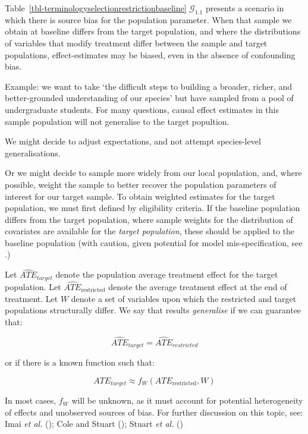 \documentclass[
  single column]{article}
\begin{document}
Table~\ref{tbl-terminologyselectionrestrictionbaseline}
\(\mathcal{G}_{1.1}\) presents a scenario in which there is source bias
for the population parameter. When that sample we obtain at baseline
differs from the target population, and where the distributions of
variables that modify treatment differ between the sample and target
populations, effect-estimates may be biased, even in the absence of
confounding bias.

Example: we want to take `the difficult steps to building a broader,
richer, and better-grounded understanding of our species' but have
sampled from a pool of undergraduate students. For many questions,
causal effect estimates in this sample population will not generalise to
the target popultion.

We might decide to adjust expectations, and not attempt species-level
generalisations.

Or we might decide to sample more widely from our local population, and,
where possible, weight the sample to better recover the population
parameters of interest for our target sample. To obtain weighted
estimates for the target population, we must first defined by
eligibility criteria. If the baseline population differs from the target
population, where sample weights for the distribution of covariates are
available for the \emph{target population}, these should be applied to
the baseline population (with caution, given potential for model
mis-specification, see .)

Let \(\widehat{ATE}_{target}\) denote the population average treatment
effect for the target population. Let
\(\widehat{ATE}_{\text{restricted}}\) denote the average treatment
effect at the end of treatment. Let \(W\) denote a set of variables upon
which the restricted and target populations structurally differ. We say
that results \emph{generalise} if we can guarantee that:

\[
\widehat{ATE}_{target} =  \widehat{ATE}_{restricted} 
\]

or if there is a known function such that:

\[
ATE_{target}\approx  f_W(ATE_{\text{restricted}}, W)
\]

In most cases, \(f_W\) will be unknown, as it must account for potential
heterogeneity of effects and unobserved sources of bias. For further
discussion on this topic, see: Imai \emph{et al.}
(); Cole and Stuart
(); Stuart \emph{et al.}
()
\end{document}
